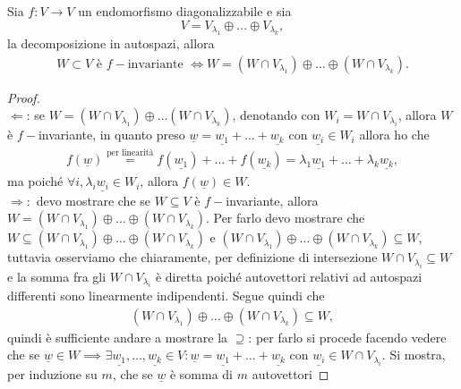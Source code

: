 \begin{lemma}
    Sia $f: V \to V$ un endomorfismo diagonalizzabile e sia
    $$
        V = V_{\lambda_1} \oplus \ldots \oplus V_{\lambda_k},
    $$
    la decomposizione in autospazi, allora
    \begin{align}
        W \subset V \text{ è } f-\text{invariante } \iff W = (W \cap V_{\lambda_1}) \oplus \ldots \oplus (W \cap V_{\lambda_k}).
    \end{align}
\end{lemma}
\begin{proof} \hspace{1cm} \\
    $\boxed{\Leftarrow}$: se $W = (W \cap V_{\lambda_1}) \oplus \ldots (W \cap V_{\lambda_k})$, denotando con $W_i = W \cap V_{\lambda_i}$, allora $W$ è $f-$invariante, in quanto preso $\underline{w} = \underline{w_1} + \ldots + \underline{w_k}$ con $\underline{w_i} \in W_i$ allora ho che
    \begin{align}
        f(\underline{w}) \stackrel{\text{per linearità}}{=} f(\underline{w_1}) + \ldots + f(\underline{w_k}) = \lambda_1 \underline{w_1} + \ldots + \lambda_k \underline{w_k},
    \end{align}
    ma poiché $\forall i, \lambda_i \underline{w_i} \in W_i$, allora $f(\underline{w}) \in W$. \\
    $\boxed{\Rightarrow}:$ devo mostrare che se $W \subseteq V$ è $f-$invariante, allora $W = (W \cap V_{\lambda_1}) \oplus \ldots \oplus (W \cap V_{\lambda_k})$. Per farlo devo mostrare che $W \subseteq (W \cap V_{\lambda_1}) \oplus \ldots \oplus (W \cap V_{\lambda_k})$ e $(W \cap V_{\lambda_1}) \oplus \ldots \oplus (W \cap V_{\lambda_k}) \subseteq W$, tuttavia osserviamo che
    chiaramente, per definizione di intersezione $W \cap V_{\lambda_i} \subseteq W$ e la somma fra gli $W \cap V_{\lambda_i}$ è diretta poiché autovettori relativi ad autospazi differenti sono linearmente indipendenti. Segue quindi che 
    \begin{align}
        (W \cap V_{\lambda_1}) \oplus \ldots \oplus (W \cap V_{\lambda_k}) \subseteq W,
    \end{align}
    quindi è sufficiente andare a mostrare la $\boxed{\supseteq}$: per farlo si procede facendo vedere che se $\underline{w} \in W \implies \exists \underline{w_1}, \ldots, \underline{w_k} \in V: \underline{w} = \underline{w_1} + \ldots + \underline{w_k}$ con $\underline{w_i} \in W \cap V_{\lambda_i}$. Si mostra, per induzione su $m$, che se $\underline{w}$ è somma di $m$ autovettori

\end{proof}
